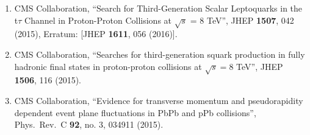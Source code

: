 \begin{enumerate}
\item CMS Collaboration, ``Search for Third-Generation Scalar Leptoquarks in the t$\tau$ Channel in Proton-Proton Collisions at $\sqrt{s}$ = 8 TeV'', JHEP {\bf 1507}, 042 (2015), Erratum: [JHEP {\bf 1611}, 056 (2016)].

\item CMS Collaboration, ``Searches for third-generation squark production in fully hadronic final states in proton-proton collisions at $ \sqrt{s} = 8$ TeV'', JHEP {\bf 1506}, 116 (2015).

\item CMS Collaboration, ``Evidence for transverse momentum and pseudorapidity dependent event plane fluctuations in PbPb and pPb collisions'', Phys.\ Rev.\ C {\bf 92}, no. 3, 034911 (2015).
  \end{enumerate}

